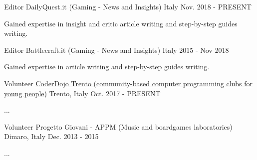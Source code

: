 

\begin{cventries}

  \cventry
    {Editor} %
    {DailyQuest.it (Gaming - News and Insights)} %
    {Italy} %
    {Nov. 2018 - PRESENT} %
    {
      \begin{cvitems} %
        \item {Gained expertise in insight and critic article writing and step-by-step guides writing.}
      \end{cvitems}
    }

  \cventry
    {Editor} %
    {Battlecraft.it (Gaming - News and Insights)} %
    {Italy} %
    {2015 - Nov 2018} %
    {
      \begin{cvitems} %
        \item {Gained expertise in article writing and step-by-step guides writing.}
      \end{cvitems}
    }

  \cventry
    {Volunteer} %
    {\href{https://www.coderdojotrento.it/}{CoderDojo Trento (community-based computer programming clubs for young people)}} %
    {Trento, Italy} %
    {Oct. 2017 - PRESENT} %
    {
      \begin{cvitems} %
        \item {...}
      \end{cvitems}
    }

  \cventry
    {Volunteer} %
    {Progetto Giovani - APPM (Music and boardgames laboratories)} %
    {Dimaro, Italy} %
    {Dec. 2013 - 2015} %
    {
      \begin{cvitems} %
        \item {...}
      \end{cvitems}
    }

\end{cventries}